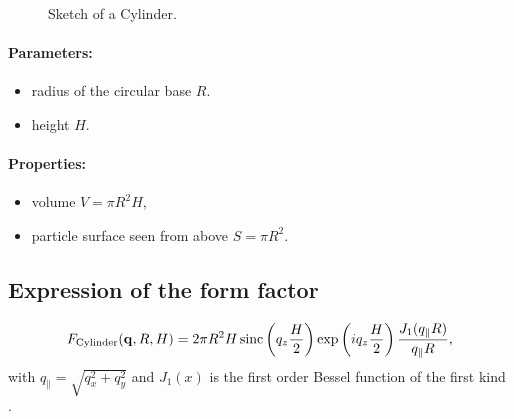 \begin{figure}[ht]
\hfill
{}
\hfill
{}
\hfill
\caption{Sketch of a Cylinder.}
\label{fig:cylinder}
\end{figure}

\paragraph{Parameters:}
\begin{itemize}
\item radius of the circular base $R$. 
\item height $H$.
\end{itemize}

\paragraph{Properties:}
\begin{itemize}
\item volume $V = \pi R^2 H$,
\item particle surface seen from above $S=\pi R^2$.
\end{itemize}

\subsection{Expression of the form factor}
  \begin{equation*}
F_{\rm{Cylinder}}(\mathbf{q},R, H)=  2\pi
 R^2 H  \operatorname{sinc}\left(q_ z \frac{H}{2}\right) \exp\left(i q_ z \frac{H}{2}\right) \frac{J_1(q_{\parallel} R )}{q_{\parallel} R },
 \end{equation*}
with $q_{\parallel}=\sqrt{q_x^2+q_y^2}$ and $J_1(x)$ is the first order
Bessel function of the first kind \cite{AbSt64}.

